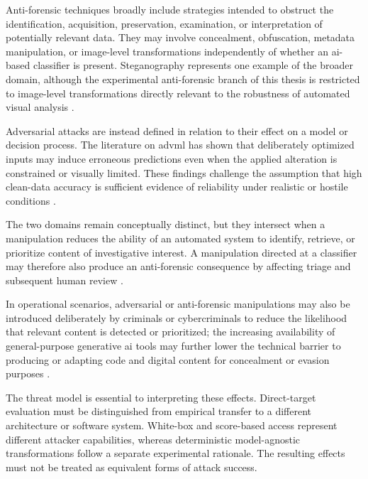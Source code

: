 Anti-forensic techniques broadly include strategies intended to obstruct the
identification, acquisition, preservation, examination, or interpretation of
potentially relevant data. They may involve concealment, obfuscation, metadata
manipulation, or image-level transformations independently of whether an
\gls{ai}-based classifier is present. Steganography represents one example of
the broader domain, although the experimental anti-forensic branch of this
thesis is restricted to image-level transformations directly relevant to the
robustness of automated visual analysis
\cite{yaacoub2021digital,sanna2025cybercrime}.

Adversarial attacks are instead defined in relation to their effect on a model
or decision process. The literature on \gls{advml} has shown that deliberately
optimized inputs may induce erroneous predictions even when the applied
alteration is constrained or visually limited. These findings challenge the
assumption that high clean-data accuracy is sufficient evidence of reliability
under realistic or hostile conditions
\cite{goodfellow2015explaining,carlini2017towards,biggio2018wild,nowroozi2021survey}.

The two domains remain conceptually distinct, but they intersect when a
manipulation reduces the ability of an automated system to identify, retrieve,
or prioritize content of investigative interest. A manipulation directed at a
classifier may therefore also produce an anti-forensic consequence by affecting
triage and subsequent human review
\cite{sanna2024preliminary,sanna2025pixelperfect}.

In operational scenarios, adversarial or anti-forensic manipulations may also
be introduced deliberately by criminals or cybercriminals to reduce the
likelihood that relevant content is detected or prioritized; the increasing
availability of general-purpose generative \gls{ai} tools may further lower the
technical barrier to producing or adapting code and digital content for
concealment or evasion purposes
\cite{sanna2025cybercrime}.

The threat model is essential to interpreting these effects. Direct-target
evaluation must be distinguished from empirical transfer to a different
architecture or software system. White-box and score-based access represent
different attacker capabilities, whereas deterministic model-agnostic
transformations follow a separate experimental rationale. The resulting effects
must not be treated as equivalent forms of attack success.

